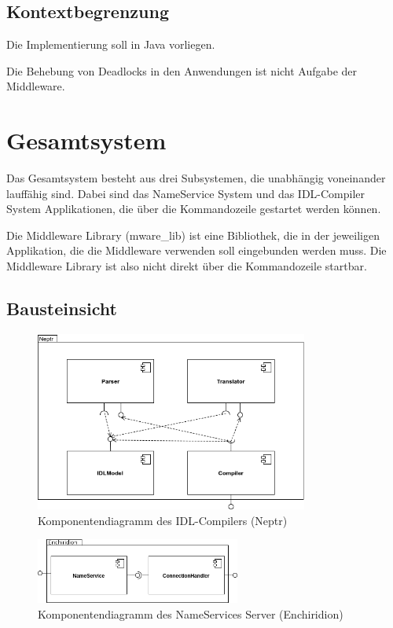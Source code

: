 \documentclass{article}
\begin{document}
\subsection{Kontextbegrenzung}
Die Implementierung soll in Java vorliegen.

Die Behebung von Deadlocks in den Anwendungen ist nicht Aufgabe der Middleware.

\newpage

\section{Gesamtsystem}
Das Gesamtsystem besteht aus drei Subsystemen, die unabhängig voneinander lauffähig sind.
Dabei sind das NameService System und das IDL-Compiler System Applikationen, die über
die Kommandozeile gestartet werden können.

Die Middleware Library (mware\_lib) ist eine Bibliothek, die in der jeweiligen Applikation,
die die Middleware verwenden soll eingebunden werden muss. Die Middleware Library ist also
nicht direkt über die Kommandozeile startbar.

\subsection{Bausteinsicht}
\begin{figure}[H]
    \centering
    \includegraphics[width=0.8\textwidth]{compiler-components.png}
    \caption[compiler-components]{Komponentendiagramm des IDL-Compilers (Neptr)}
    \label{fig:compiler-component-diagram}
\end{figure}

\begin{figure}[H]
    \centering
    \includegraphics[width=0.6\textwidth]{nameservice-components.png}
    \caption[nameservice-components]{Komponentendiagramm des NameServices Server (Enchiridion)}
    \label{fig:nameservice-component-diagram}
\end{figure}
\end{document}
